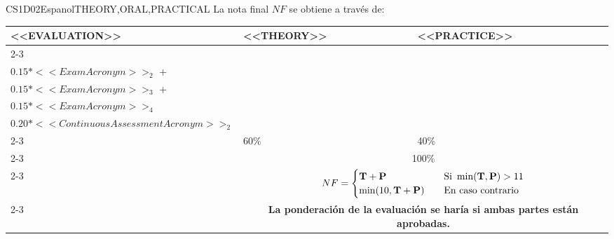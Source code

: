  
  \begin{evaluation}{CS1D02}{Espanol}{THEORY,ORAL,PRACTICAL}
    La nota final $NF$ se obtiene a través de:

  \begin{tabularx}{0.9\textwidth}{|X|p{}|p{}|} \hline
  \multirow{4}{*}{\uppercase{<<Evaluation>>}} & \uppercase{<<Theory>>} & \uppercase{<<Practice>>} \\ \cline{2-3}
  & %
      \begin{minipage}{0.95\textwidth}
      \begin{tabular}{l}
          $\text{\textbf{T}} = 0.15*<<ExamAcronym>>_{1}$  + \\
          $0.15*<<ExamAcronym>>_{2}$  + \\
          $0.15*<<ExamAcronym>>_{3}$  + \\
          $0.15*<<ExamAcronym>>_{4}$
          \end{tabular}
      \end{minipage}
  & %
      \begin{minipage}{0.95\textwidth}
      \begin{tabular}{l}
          $\text{\textbf{P}} = 0.20*<<ContinuousAssessmentAcronym>>_{1}$ + \\
          $0.20*<<ContinuousAssessmentAcronym>>_{2}$
      \end{tabular}
      \end{minipage}                 \\ \cline{2-3}

  & %
  60\% 
  & %
  40\% \\ \cline{2-3}
  & \multicolumn{2}{c|}{100\%}  \\ \cline{2-3}
  & \multicolumn{2}{c|}{
    \begin{math}
      NF =
      \begin{cases}
        \text{\textbf{T}} + \text{\textbf{P}}  & \quad \text{Si } \min(\text{\textbf{T}},\text{\textbf{P}}) > 11  \\
        \min(10,\text{\textbf{T}} + \text{\textbf{P}})     & \quad \text{En caso contrario}
      \end{cases}
    \end{math}
  } \\ \cline{2-3}
  & \multicolumn{2}{c|}{\textbf{La ponderación de la evaluación se haría si ambas partes están aprobadas.}}  \\ \hline
  \end{tabularx}


\end{evaluation}
